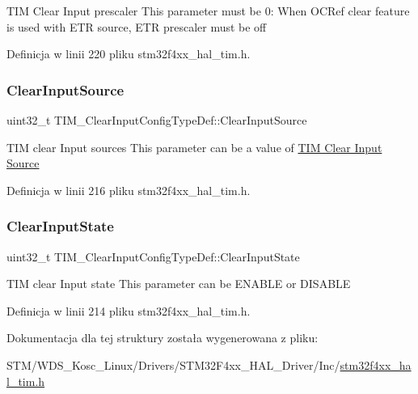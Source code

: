 T\+IM Clear Input prescaler This parameter must be 0\+: When O\+C\+Ref clear feature is used with E\+TR source, E\+TR prescaler must be off 

Definicja w linii 220 pliku stm32f4xx\+\_\+hal\+\_\+tim.\+h.

\mbox{\label{struct_t_i_m___clear_input_config_type_def_a776d2f14021a82e022468fd46594b8a0}} 
\subsubsection{\texorpdfstring{Clear\+Input\+Source}{ClearInputSource}}
{\footnotesize\ttfamily uint32\+\_\+t T\+I\+M\+\_\+\+Clear\+Input\+Config\+Type\+Def\+::\+Clear\+Input\+Source}

T\+IM clear Input sources This parameter can be a value of \hyperlink{group___t_i_m___clear_input___source}{T\+IM Clear Input Source} 

Definicja w linii 216 pliku stm32f4xx\+\_\+hal\+\_\+tim.\+h.

\mbox{\label{struct_t_i_m___clear_input_config_type_def_a01d4b91dd297c4f0582a4d9179abf32f}} 
\subsubsection{\texorpdfstring{Clear\+Input\+State}{ClearInputState}}
{\footnotesize\ttfamily uint32\+\_\+t T\+I\+M\+\_\+\+Clear\+Input\+Config\+Type\+Def\+::\+Clear\+Input\+State}

T\+IM clear Input state This parameter can be E\+N\+A\+B\+LE or D\+I\+S\+A\+B\+LE 

Definicja w linii 214 pliku stm32f4xx\+\_\+hal\+\_\+tim.\+h.



Dokumentacja dla tej struktury została wygenerowana z pliku\+:\begin{DoxyCompactItemize}
\item 
S\+T\+M/\+W\+D\+S\+\_\+\+Kosc\+\_\+\+Linux/\+Drivers/\+S\+T\+M32\+F4xx\+\_\+\+H\+A\+L\+\_\+\+Driver/\+Inc/\hyperlink{stm32f4xx__hal__tim_8h}{stm32f4xx\+\_\+hal\+\_\+tim.\+h}\end{DoxyCompactItemize}

